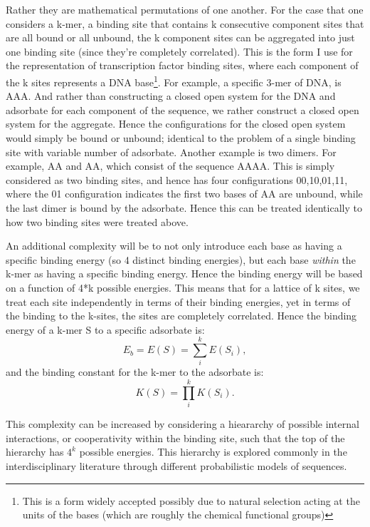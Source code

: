 Rather they are mathematical permutations of one another.  For the case that one considers a k-mer, a binding site that contains k consecutive component sites that are all bound or all unbound, the k component sites can be aggregated into just one binding site (since they're completely correlated).  This is the form I use for the representation of transcription factor binding sites, where each component of the k sites represents a DNA base\footnote{This is a form widely accepted possibly due to natural selection acting at the units of the bases (which are roughly the chemical functional groups)}.  For example, a specific 3-mer of DNA, is AAA.  And rather than constructing a closed open system for the DNA and adsorbate for each component of the sequence, we rather construct a closed open system for the aggregate.  Hence the configurations for the closed open system would simply be bound or unbound; identical to the problem of a single binding site with variable number of adsorbate.  Another example is two dimers.  For example, AA and AA, which consist of the sequence AAAA.  This is simply considered as two binding sites, and hence has four configurations 00,10,01,11, where the 01 configuration indicates the first two bases of AA are unbound, while the last dimer is bound by the adsorbate.  Hence this can be treated identically to how two binding sites were treated above.

An additional complexity will be to not only introduce each base as having a specific binding energy (so 4 distinct binding energies), but each base \textit{within} the k-mer as having a specific binding energy.  Hence the binding energy will be based on a function of 4*k possible energies.  This means that for a lattice of k sites, we treat each site independently in terms of their binding energies, yet in terms of the binding to the k-sites, the sites are completely correlated.  Hence the binding energy of a k-mer S to a specific adsorbate is:
\begin{equation}
E_b= E(S)=\sum_i^k E(S_i),
\end{equation}
and the binding constant for the k-mer to the adsorbate is:
\begin{equation}
K(S)=\prod_i^k K(S_i).
\end{equation}

  This complexity can be increased by considering a hieararchy of possible internal interactions, or cooperativity within the binding site, such that the top of the hierarchy has $4^k$ possible energies.  This hierarchy is explored commonly in the interdisciplinary literature through different probabilistic models of sequences. 

